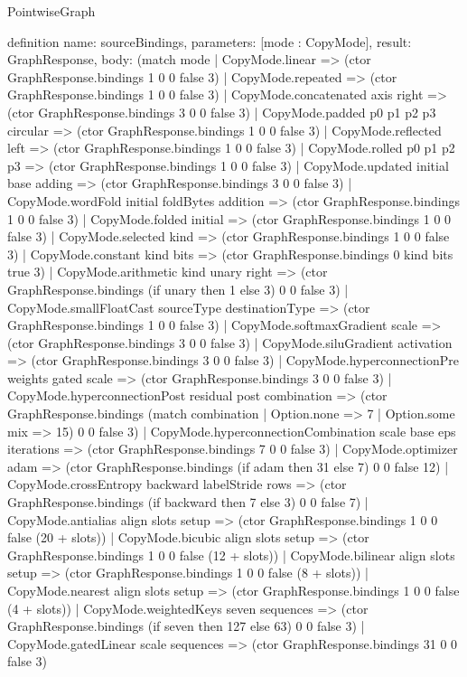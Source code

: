 \begin{lexlean}{PointwiseGraph}
\begin{semanticmodule}
definition{
  name: sourceBindings,
  parameters: [mode : CopyMode],
  result: GraphResponse,
  body: (match mode
    | CopyMode.linear => (ctor GraphResponse.bindings 1 0 0 false 3)
    | CopyMode.repeated => (ctor GraphResponse.bindings 1 0 0 false 3)
    | CopyMode.concatenated axis right => (ctor GraphResponse.bindings 3 0 0 false 3)
    | CopyMode.padded p0 p1 p2 p3 circular => (ctor GraphResponse.bindings 1 0 0 false 3)
    | CopyMode.reflected left => (ctor GraphResponse.bindings 1 0 0 false 3)
    | CopyMode.rolled p0 p1 p2 p3 => (ctor GraphResponse.bindings 1 0 0 false 3)
    | CopyMode.updated initial base adding => (ctor GraphResponse.bindings 3 0 0 false 3)
    | CopyMode.wordFold initial foldBytes addition => (ctor GraphResponse.bindings 1 0 0 false 3)
    | CopyMode.folded initial => (ctor GraphResponse.bindings 1 0 0 false 3)
    | CopyMode.selected kind => (ctor GraphResponse.bindings 1 0 0 false 3)
    | CopyMode.constant kind bits => (ctor GraphResponse.bindings 0 kind bits true 3)
    | CopyMode.arithmetic kind unary right => (ctor GraphResponse.bindings (if unary then 1 else 3) 0 0 false 3)
    | CopyMode.smallFloatCast sourceType destinationType => (ctor GraphResponse.bindings 1 0 0 false 3)
    | CopyMode.softmaxGradient scale => (ctor GraphResponse.bindings 3 0 0 false 3)
    | CopyMode.siluGradient activation => (ctor GraphResponse.bindings 3 0 0 false 3)
    | CopyMode.hyperconnectionPre weights gated scale => (ctor GraphResponse.bindings 3 0 0 false 3)
    | CopyMode.hyperconnectionPost residual post combination => (ctor GraphResponse.bindings (match combination
      | Option.none => 7
      | Option.some mix => 15) 0 0 false 3)
    | CopyMode.hyperconnectionCombination scale base eps iterations => (ctor GraphResponse.bindings 7 0 0 false 3)
    | CopyMode.optimizer adam => (ctor GraphResponse.bindings (if adam then 31 else 7) 0 0 false 12)
    | CopyMode.crossEntropy backward labelStride rows => (ctor GraphResponse.bindings (if backward then 7 else 3) 0 0 false 7)
    | CopyMode.antialias align slots setup => (ctor GraphResponse.bindings 1 0 0 false (20 + slots))
    | CopyMode.bicubic align slots setup => (ctor GraphResponse.bindings 1 0 0 false (12 + slots))
    | CopyMode.bilinear align slots setup => (ctor GraphResponse.bindings 1 0 0 false (8 + slots))
    | CopyMode.nearest align slots setup => (ctor GraphResponse.bindings 1 0 0 false (4 + slots))
    | CopyMode.weightedKeys seven sequences => (ctor GraphResponse.bindings (if seven then 127 else 63) 0 0 false 3)
    | CopyMode.gatedLinear scale sequences => (ctor GraphResponse.bindings 31 0 0 false 3)
}
\end{semanticmodule}
\end{lexlean}
